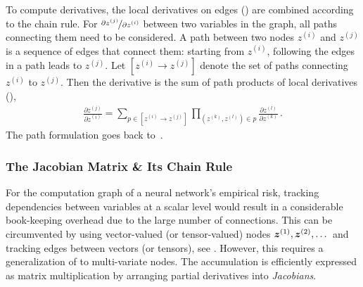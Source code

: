 To compute derivatives, the local derivatives on edges
() are combined according to the chain
rule. For $\nicefrac{\partial z^{(j)}}{ \partial z^{(i)}}$ between two variables
in the graph, all paths connecting them need to be considered. A path between
two nodes $z^{(i)}$ and $z^{(j)}$ is a sequence of edges that connect them:
starting from $z^{(i)}$, following the edges in a path leads to $z^{(j)}$. Let
$[z^{(i)} \to z^{(j)}]$ denote the set of paths connecting $z^{(i)}$ to
$z^{(j)}$. Then the derivative is the sum of path products of local derivatives
(),
\begin{align}
  \label{eq:background::BauersFormula}
  \frac{\partial z^{(j)}}{\partial z^{(i)}}
  =
  \sum_{p \in [z^{(i)} \to z^{(j)}]}
  \prod_{(z^{(k)}, z^{(l)}) \in p}
  \frac{\partial z^{(l)}}{\partial z^{(k)}}\,.
\end{align}
The path formulation goes back to~\citet{bauer1974computational}.

\subsubsection{The Jacobian Matrix \& Its Chain Rule}
For the computation graph of a neural network's empirical risk, tracking
dependencies between variables at a scalar level would result in a considerable
book-keeping overhead due to the large number of connections. This can be
circumvented by using vector-valued (or tensor-valued) nodes $ {\bm{z}}^{(1)},
{\bm{z}}^{(2)}, \dots$ and tracking edges between vectors (or tensors), see
. However, this requires a
generalization of  to multi-variate nodes.
The accumulation is efficiently expressed as matrix multiplication by arranging
partial derivatives into \emph{Jacobians}.


